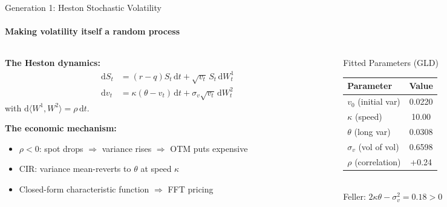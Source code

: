 \documentclass[aspectratio=169]{beamer}
\begin{document}
\begin{frame}{Generation 1: Heston Stochastic Volatility}
\framesubtitle{Making volatility itself a random process}

\begin{columns}[T]
\begin{column}{0.55\textwidth}
\textbf{The Heston dynamics:}
\begin{align*}
\mathrm{d}S_t &= (r-q)S_t\,\mathrm{d}t + \sqrt{v_t}\,S_t\,\mathrm{d}W_t^1\\
\mathrm{d}v_t &= \kappa(\theta-v_t)\,\mathrm{d}t + \sigma_v\sqrt{v_t}\,\mathrm{d}W_t^2
\end{align*}
with $\mathrm{d}\langle W^1,W^2\rangle = \rho\,\mathrm{d}t$.

\vspace{0.3cm}
\textbf{The economic mechanism:}
\begin{itemize}
    \item $\rho < 0$: spot drops $\Rightarrow$ variance rises $\Rightarrow$ OTM puts expensive
    \item CIR: variance mean-reverts to $\theta$ at speed $\kappa$
    \item Closed-form characteristic function $\Rightarrow$ FFT pricing
\end{itemize}
\end{column}

\begin{column}{0.42\textwidth}
\begin{block}{Fitted Parameters (GLD)}
\begin{tabular}{@{}lc@{}}\toprule
Parameter & Value\\
\midrule
$v_0$ (initial var) & 0.0220\\
$\kappa$ (speed) & 10.00\\
$\theta$ (long var) & 0.0308\\
$\sigma_v$ (vol of vol) & 0.6598\\
$\rho$ (correlation) & +0.24\\
\bottomrule
\end{tabular}
\\[0.2cm]
\footnotesize Feller: $2\kappa\theta - \sigma_v^2 = 0.18 > 0$ \checkmark
\end{block}
\end{column}
\end{columns}

\end{frame}

\end{document}
